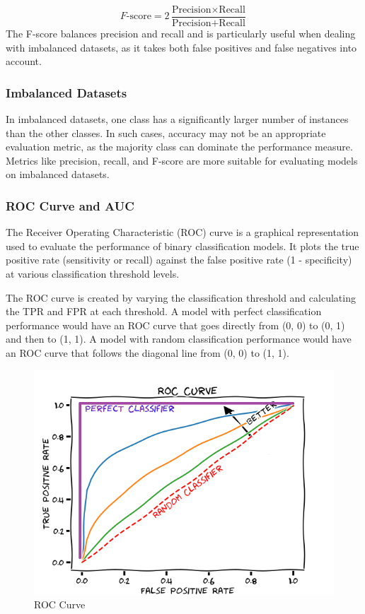 \documentclass[12pt]{article}
\begin{document}
$$F\text{-score} = 2 \frac{\text{Precision} \times \text{Recall}}{\text{Precision} + \text{Recall}}$$
The F-score balances precision and recall and is particularly useful when dealing with imbalanced datasets, as it takes both false positives and false negatives into account.

\subsubsection{Imbalanced Datasets}
In imbalanced datasets, one class has a significantly larger number of instances than the other classes. In such cases, accuracy may not be an appropriate evaluation metric, as the majority class can dominate the performance measure. Metrics like precision, recall, and F-score are more suitable for evaluating models on imbalanced datasets.

\subsubsection{ROC Curve and AUC}
The Receiver Operating Characteristic (ROC) curve is a graphical representation used to evaluate the performance of binary classification models. It plots the true positive rate (sensitivity or recall) against the false positive rate (1 - specificity) at various classification threshold levels.

The ROC curve is created by varying the classification threshold and calculating the TPR and FPR at each threshold. A model with perfect classification performance would have an ROC curve that goes directly from (0, 0) to (0, 1) and then to (1, 1). A model with random classification performance would have an ROC curve that follows the diagonal line from (0, 0) to (1, 1).

\begin{figure}[h]
    \centering
    \includegraphics[scale=0.7]{./media/roc.png}
    \caption{ROC Curve}
    \label{fig:roc}
\end{figure}
\end{document}
